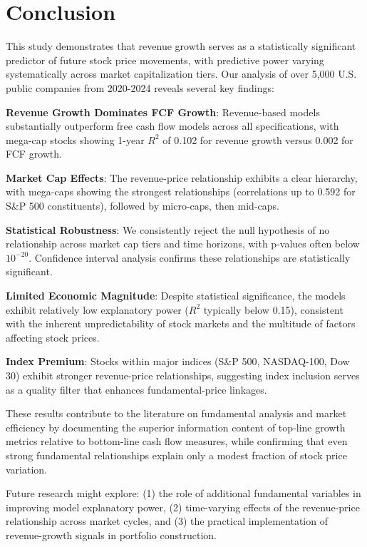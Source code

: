\documentclass[11pt]{article}
\begin{document}
\section{Conclusion}

This study demonstrates that revenue growth serves as a statistically significant predictor of future stock price movements, with predictive power varying systematically across market capitalization tiers. Our analysis of over 5,000 U.S. public companies from 2020-2024 reveals several key findings:

\textbf{Revenue Growth Dominates FCF Growth}: Revenue-based models substantially outperform free cash flow models across all specifications, with mega-cap stocks showing 1-year $R^2$ of 0.102 for revenue growth versus 0.002 for FCF growth.

\textbf{Market Cap Effects}: The revenue-price relationship exhibits a clear hierarchy, with mega-caps showing the strongest relationships (correlations up to 0.592 for S\&P 500 constituents), followed by micro-caps, then mid-caps.

\textbf{Statistical Robustness}: We consistently reject the null hypothesis of no relationship across market cap tiers and time horizons, with p-values often below $10^{-20}$. Confidence interval analysis confirms these relationships are statistically significant.

\textbf{Limited Economic Magnitude}: Despite statistical significance, the models exhibit relatively low explanatory power ($R^2$ typically below 0.15), consistent with the inherent unpredictability of stock markets and the multitude of factors affecting stock prices.

\textbf{Index Premium}: Stocks within major indices (S\&P 500, NASDAQ-100, Dow 30) exhibit stronger revenue-price relationships, suggesting index inclusion serves as a quality filter that enhances fundamental-price linkages.

These results contribute to the literature on fundamental analysis and market efficiency by documenting the superior information content of top-line growth metrics relative to bottom-line cash flow measures, while confirming that even strong fundamental relationships explain only a modest fraction of stock price variation.

Future research might explore: (1) the role of additional fundamental variables in improving model explanatory power, (2) time-varying effects of the revenue-price relationship across market cycles, and (3) the practical implementation of revenue-growth signals in portfolio construction.
\end{document}
